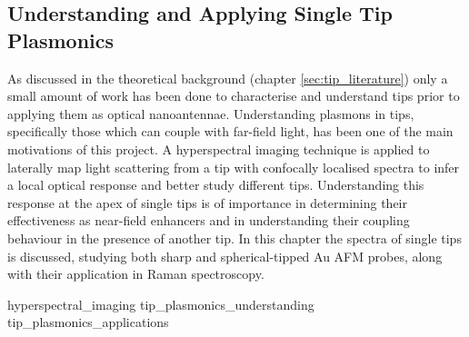 \documentclass[12pt, a4paper, oneside]{book}
\begin{document}
\begin{singlespace}
\color{white}\chapter{Understanding and Applying Single Tip Plasmonics}
\label{ch:tip_plasmonics}
\end{singlespace}



As discussed in the theoretical background (chapter \ref{sec:tip_literature}) only a small amount of work has been done to characterise and understand tips prior to applying them as optical nanoantennae. Understanding plasmons in tips, specifically those which can couple with far-field light, has been one of the main motivations of this project. A hyperspectral imaging technique is applied to laterally map light scattering from a tip with confocally localised spectra to infer a local optical response and better study different tips. Understanding this response at the apex of single tips is of importance in determining their effectiveness as near-field enhancers and in understanding their coupling behaviour in the presence of another tip. In this chapter the spectra of single tips is discussed, studying both sharp and spherical-tipped Au AFM probes, along with their application in Raman spectroscopy.

{hyperspectral_imaging}
{tip_plasmonics_understanding}
{tip_plasmonics_applications}
\end{document}
